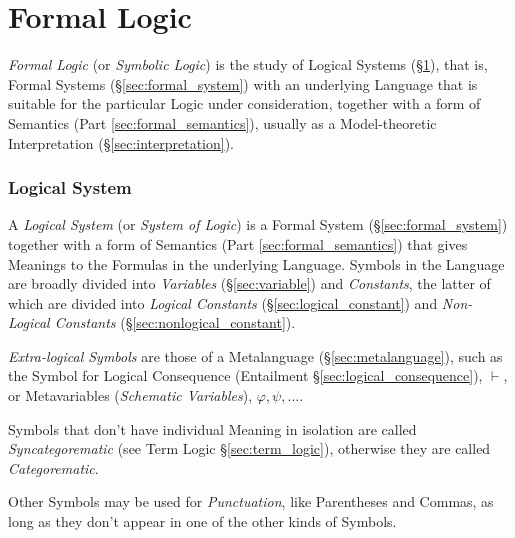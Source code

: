 \part{Formal Logic}\label{sec:formal_logic}

\emph{Formal Logic} (or \emph{Symbolic Logic}) is the study of Logical
Systems (\S\ref{sec:logical_system}), that is, Formal Systems
(\S\ref{sec:formal_system}) with an underlying Language that is
suitable for the particular Logic under consideration, together with a
form of Semantics (Part \ref{sec:formal_semantics}), usually as a
Model-theoretic Interpretation (\S\ref{sec:interpretation}).



\section{Logical System}\label{sec:logical_system}

A \emph{Logical System} (or \emph{System of Logic}) is a Formal System
(\S\ref{sec:formal_system}) together with a form of Semantics (Part
\ref{sec:formal_semantics}) that gives Meanings to the Formulas in the
underlying Language. Symbols in the Language are broadly divided into
\emph{Variables} (\S\ref{sec:variable}) and \emph{Constants}, the
latter of which are divided into \emph{Logical Constants}
(\S\ref{sec:logical_constant}) and \emph{Non-Logical Constants}
(\S\ref{sec:nonlogical_constant}).

\emph{Extra-logical Symbols} are those of a Metalanguage
(\S\ref{sec:metalanguage}), such as the Symbol for Logical Consequence
(Entailment \S\ref{sec:logical_consequence}), $\vdash$, or
Metavariables (\emph{Schematic Variables}), $\varphi, \psi, \ldots$.

Symbols that don't have individual Meaning in isolation are called
\emph{Syncategorematic} (see Term Logic \S\ref{sec:term_logic}),
otherwise they are called \emph{Categorematic}.

Other Symbols may be used for \emph{Punctuation}, like Parentheses and
Commas, as long as they don't appear in one of the other kinds of
Symbols.

